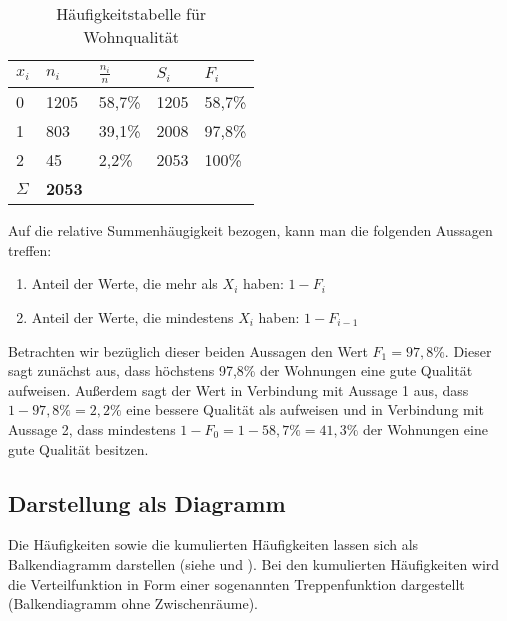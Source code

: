 \begin{table}[h]
\caption{Häufigkeitstabelle für Wohnqualität} \label{tab:excel_bsp}
\begin{center}
\begin{tabular}{p{1.25cm}p{1.25cm}p{1.25cm}p{1.25cm}p{1.25cm}}
\hline \hline
\textbf{$x_i$} & \textbf{$n_i$} & \textbf{$\frac{n_i}{n}$} & \textbf{$S_i$} & \textbf{$F_i$}\\ 
\hline
0 & 1205 & 58,7\% & 1205 & 58,7\% \\
1 & 803 & 39,1\% & 2008 & 97,8\% \\
2 & 45 & 2,2\% & 2053 & 100\% \\
\hline
$\Sigma$ & \textbf{2053}
\end{tabular}
\end{center}
\label{default}
\end{table}%

Auf die relative Summenhäugigkeit bezogen, kann man die folgenden Aussagen treffen:
\begin{enumerate}
\item Anteil der Werte, die mehr als $X_i$ haben: $1-F_i$
\item Anteil der Werte, die mindestens $X_i$ haben: $1-F_{i-1}$
\end{enumerate}

Betrachten wir bezüglich dieser beiden Aussagen den Wert $F_1=97,8\%$. 
Dieser sagt zunächst aus, dass höchstens 97,8\% der Wohnungen eine gute Qualität aufweisen.
Außerdem sagt der Wert in Verbindung mit Aussage 1 aus, dass $1-97,8\%=2,2\%$ eine bessere Qualität als  aufweisen 
und in Verbindung mit Aussage 2, dass mindestens $1-F_0=1-58,7\%=41,3\%$ der Wohnungen eine gute Qualität besitzen.

 
\subsection{Darstellung als Diagramm}
Die Häufigkeiten sowie die kumulierten Häufigkeiten lassen sich als Balkendiagramm darstellen (siehe  und ).
Bei den kumulierten Häufigkeiten wird die Verteilfunktion in Form einer sogenannten Treppenfunktion dargestellt (Balkendiagramm ohne Zwischenräume).





